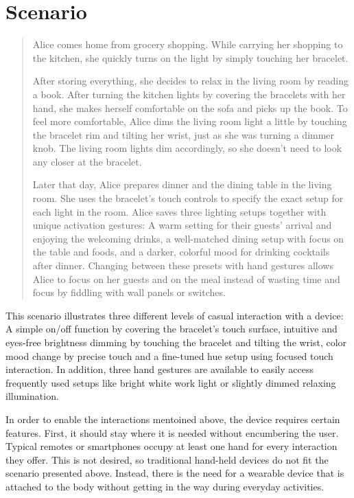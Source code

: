 \chapter{Scenario} %
\label{sec:scenario}

\begin{quotation}
Alice comes home from grocery shopping. While carrying her shopping to the kitchen, she quickly turns on the light by simply touching her bracelet.

After storing everything, she decides to relax in the living room by reading a book. After turning the kitchen lights by covering the bracelets with her hand, she makes herself comfortable on the sofa and picks up the book. To feel more comfortable, Alice dims the living room light a little by touching the bracelet rim and tilting her wrist, just as she was turning a dimmer knob. The living room lights dim accordingly, so she doesn't need to look any closer at the bracelet.

Later that day, Alice prepares dinner and the dining table in the living room. She uses the bracelet's touch controls to specify the exact setup for each light in the room. Alice saves three lighting setups together with unique activation gestures: A warm setting for their guests' arrival and enjoying the welcoming drinks, a well-matched dining setup with focus on the table and foods, and a darker, colorful mood for drinking cocktails after dinner. Changing between these presets with hand gestures allows Alice to focus on her guests and on the meal instead of wasting time and focus by fiddling with wall panels or switches.
\end{quotation}

This scenario illustrates three different levels of casual interaction with a device: A simple on/off function by covering the bracelet's touch surface, intuitive and eyes-free brightness dimming by touching the bracelet and tilting the wrist, color mood change by precise touch and a fine-tuned hue setup using focused touch interaction. In addition, three hand gestures are available to easily access frequently used setups like bright white work light or slightly dimmed relaxing illumination.

In order to enable the interactions mentoined above, the device requires certain features. First, it should stay where it is needed without encumbering the user. Typical remotes or smartphones occupy at least one hand for every interaction they offer. This is not desired, so traditional hand-held devices do not fit the scenario presented above. Instead, there is the need for a wearable device that is attached to the body without getting in the way during everyday activities.

